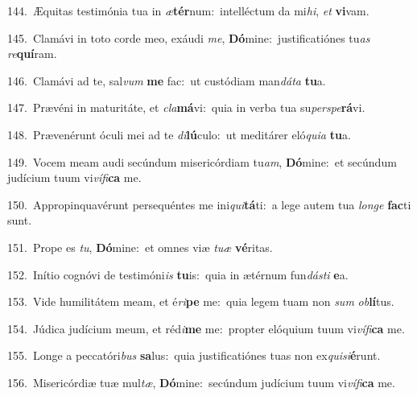 {\numbfont\textcolor{\numbcolor}{144.}}~Æquitas testimónia tua in \textit{æ}\-\textbf{tér}num:~\star intelléctum da mi\-\textit{hi}\-, \textit{et} \textbf{vi}\-vam.\par
{\numbfont\textcolor{\numbcolor}{145.}}~Clamávi in toto corde meo, exáudi \textit{me}\-, \textbf{Dó}\-mine:~\star justificatiónes tu\textit{as} \textit{re}\-\textbf{quí}ram.\par
{\numbfont\textcolor{\numbcolor}{146.}}~Clamávi ad te, sal\textit{vum} \textbf{me} fac:~\star ut custódiam man\-\textit{dá}\-\textit{ta} \textbf{tu}\-a.\par
{\numbfont\textcolor{\numbcolor}{147.}}~Prævéni in maturitáte, et \textit{cla}\-\textbf{má}vi:~\star quia in verba tua su\-\textit{per}\-\textit{spe}\textbf{rá}vi.\par
{\numbfont\textcolor{\numbcolor}{148.}}~Prævenérunt óculi mei ad te \textit{di}\-\textbf{lú}culo:~\star ut meditárer eló\-\textit{qui}\-\textit{a} \textbf{tu}\-a.\par
{\numbfont\textcolor{\numbcolor}{149.}}~Vocem meam audi secúndum misericórdiam tu\-\textit{am}\-, \textbf{Dó}\-mine:~\star et secúndum judícium tuum vi\-\textit{ví}\-\textit{fi}\textbf{ca} me.\par
{\numbfont\textcolor{\numbcolor}{150.}}~Appropinquavérunt persequéntes me ini\-\textit{qui}\-\textbf{tá}ti:~\star a lege autem tua \textit{lon}\-\textit{ge} \textbf{fac}\-ti sunt.\par
{\numbfont\textcolor{\numbcolor}{151.}}~Prope es \textit{tu}\-, \textbf{Dó}\-mine:~\star et omnes viæ \textit{tu}\-\textit{æ} \textbf{vé}\-ritas.\par
{\numbfont\textcolor{\numbcolor}{152.}}~Inítio cognóvi de testimóni\textit{is} \textbf{tu}\-is:~\star quia in ætérnum fun\-\textit{dás}\-\textit{ti} \textbf{e}\-a.\par
{\numbfont\textcolor{\numbcolor}{153.}}~Vide humilitátem meam, et é\-\textit{ri}\-\textbf{pe} me:~\star quia legem tuam non \textit{sum} \textit{ob}\-\textbf{lí}tus.\par
{\numbfont\textcolor{\numbcolor}{154.}}~Júdica judícium meum, et réd\-\textit{i}\-\textbf{me} me:~\star propter elóquium tuum vi\-\textit{ví}\-\textit{fi}\textbf{ca} me.\par
{\numbfont\textcolor{\numbcolor}{155.}}~Longe a peccatóri\textit{bus} \textbf{sa}\-lus:~\star quia justificatiónes tuas non ex\-\textit{qui}\-\textit{si}\textbf{é}runt.\par
{\numbfont\textcolor{\numbcolor}{156.}}~Misericórdiæ tuæ mul\-\textit{tæ}\-, \textbf{Dó}\-mine:~\star secúndum judícium tuum vi\-\textit{ví}\-\textit{fi}\textbf{ca} me.\par
